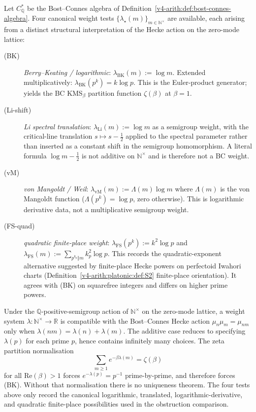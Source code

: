 \begin{definition}
\label{v4-arith:hpar-det:def:candidate-weights}
Let \(C^{*}_{\mathbb{Q}}\) be the
Bost--Connes algebra of
Definition~\ref{v4-arith:def:bost-connes-algebra}. Four canonical weight tests
\(\{\lambda_{\star}(m)\}_{m\in\mathbb{N}^{\times}}\) are available,
each arising from a distinct structural interpretation of the
Hecke action on the zero-mode lattice:
\begin{description}
\item[(BK)] \emph{Berry--Keating / logarithmic}:
\(\lambda_{\mathrm{BK}}(m):=\log m\). Extended multiplicatively:
\(\lambda_{\mathrm{BK}}(p^{k})=k\log p\). This is the Euler-product
generator; yields the BC KMS\({}_{\beta}\) partition function
\(\zeta(\beta)\) at \(\beta=1\).
\item[(Li-shift)] \emph{Li spectral translation}:
\(\lambda_{\mathrm{Li}}(m):=\log m\) as a semigroup weight, with the
critical-line translation \(s\mapsto s-\frac12\) applied to the
spectral parameter rather than inserted as a constant shift in the
semigroup homomorphism. A literal formula
\(\log m-\frac12\) is not additive on
\(\mathbb{N}^{\times}\) and is therefore not a BC weight.
\item[(vM)] \emph{von Mangoldt / Weil}:
\(\lambda_{\mathrm{vM}}(m):=\Lambda(m)\log m\) where
\(\Lambda(m)\) is the von Mangoldt function
(\(\Lambda(p^{k})=\log p\), zero otherwise). This is logarithmic
derivative data, not a multiplicative semigroup weight.
\item[(FS-quad)] \emph{quadratic finite-place weight}:
\(\lambda_{\mathrm{FS}}(p^{k}):=k^{2}\log p\) and
\(\lambda_{\mathrm{FS}}(m):=\sum_{p^{k_{p}}\Vert m}k_{p}^{2}\log p\).
This records the quadratic-exponent alternative suggested by
finite-place Hecke powers on perfectoid Iwahori charts
(Definition~\ref{v4-arith:platonic:def:S2} finite-place orientation). It agrees
with (BK) on squarefree integers and differs on higher prime powers.
\end{description}
\end{definition}

\begin{remark}
\label{v4-arith:hpar-det:rem:four-exhaust}
Under the \(\mathbb{Q}\)-positive-semigroup action of
\(\mathbb{N}^{\times}\) on the zero-mode lattice, a weight system
\(\lambda:\mathbb{N}^{\times}\to\mathbb{R}\) is compatible with the
Bost--Connes Hecke action
\(\mu_{n}\mu_{m}=\mu_{nm}\) only when
\(\lambda(nm)=\lambda(n)+\lambda(m)\). The additive case reduces to
specifying \(\lambda(p)\) for each prime \(p\), hence contains infinitely
many choices. The zeta partition normalisation
\[
 \sum_{m\ge 1} e^{-\beta\lambda(m)}=\zeta(\beta)
\]
for all \(\mathrm{Re}(\beta)>1\) forces \(e^{-\lambda(p)}=p^{-1}\)
prime-by-prime, and therefore forces (BK). Without that normalisation
there is no uniqueness theorem. The four tests above only record the
canonical logarithmic, translated, logarithmic-derivative, and
quadratic finite-place possibilities used in the obstruction comparison.
\end{remark}

